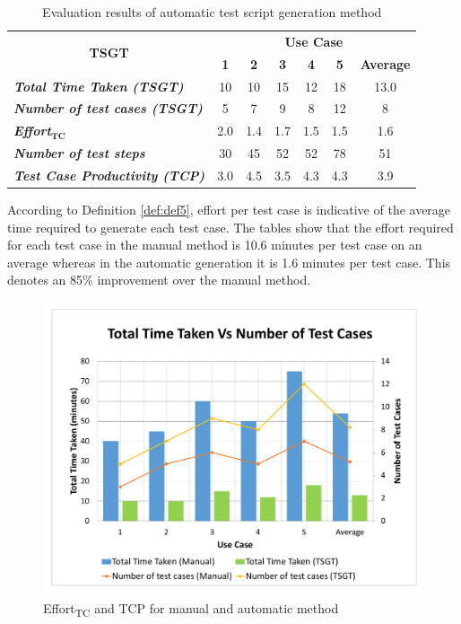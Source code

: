 \begin{table}[htbp]
  \centering
  \caption{Evaluation results of automatic test script generation method}
  	\begin{adjustbox}{width=1\textwidth}
    \begin{tabular}{|l|c|c|c|c|c|c|}
    \toprule
    \multicolumn{1}{|c|}{\multirow{2}[4]{*}{\textbf{TSGT}}} & \multicolumn{6}{c|}{\textbf{Use Case }} \\
\cmidrule{2-7}          & \textbf{1} & \textbf{2} & \textbf{3} & \textbf{4} & \textbf{5} & \textbf{Average} \\
    \midrule
    \textit{\textbf{Total Time Taken (TSGT)}} & 10    & 10    & 15    & 12    & 18    & 13.0 \\
    \midrule
    \textit{\textbf{Number of test cases (TSGT)}} & 5     & 7     & 9     & 8     & 12    & 8 \\
    \midrule
    \textit{\textbf{Effort$ _{\textbf{TC}}$}} & 2.0   & 1.4   & 1.7   & 1.5   & 1.5   & 1.6 \\
    \midrule
    \textit{\textbf{Number of test steps}} & 30    & 45    & 52    & 52    & 78    & 51 \\
    \midrule
    \textit{\textbf{Test Case Productivity (TCP)}} & 3.0   & 4.5   & 3.5   & 4.3   & 4.3   & 3.9 \\
    \bottomrule
    \end{tabular}%
    \end{adjustbox}
  \label{tab:toolresults}%
\end{table}%


According to Definition \ref{def:def5}, effort per test case is indicative of the average time required to generate each test case. The tables show that the effort required for each test case in the manual method is 10.6 minutes per test case on an average whereas in the automatic generation it is 1.6 minutes per test case. This denotes an 85\% improvement over the manual method.

\begin{figure}[htb!]
\centering
\includegraphics[scale=0.45]{content/images/Chapter6/figure2.pdf}
\caption{Effort\textsubscript{TC} and TCP for manual and automatic method}
\label{fig:chap6fig2}
\end{figure}


